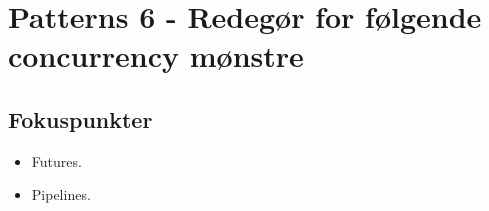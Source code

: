 \section{Patterns 6 - Redegør for følgende concurrency mønstre}

\subsection{Fokuspunkter}

\begin{itemize}
	\item Futures.
	\item Pipelines.
\end{itemize}